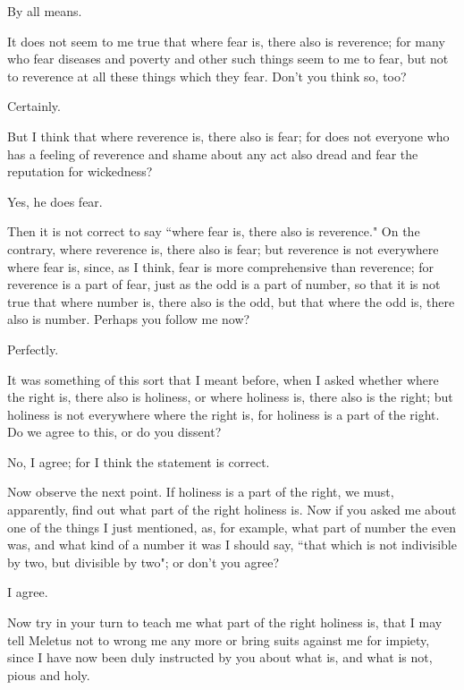 \documentclass[letterpaper,12pt]{article}
\newcommand{\stephpag}[1]{\marginnote{\small\itshape\fontfamily{ppl}\selectfont #1}}
\begin{document}
\begin{drama}
\euthyphrospeaks
By all means.

\socratesspeaks
It does not seem to me true that where fear is, there also is reverence; for many who fear diseases and poverty and other such things seem to me to fear, but not to reverence at all these things which they fear. Don't you think so, too?

\euthyphrospeaks
Certainly.

\socratesspeaks
But I think that where reverence is, there also is fear; for does not everyone who has a feeling of reverence and shame about any act \stephpag{c} also dread and fear the reputation for wickedness?

\euthyphrospeaks
Yes, he does fear.

\socratesspeaks
Then it is not correct to say ``where fear is, there also is reverence." On the contrary, where reverence is, there also is fear; but reverence is not everywhere where fear is, since, as I think, fear is more comprehensive than reverence; for reverence is a part of fear, just as the odd is a part of number, so that it is not true that where number is, there also is the odd, but that where the odd is, there also is number. Perhaps you follow me now?

\euthyphrospeaks
Perfectly.

\socratesspeaks
It was something of this sort that I meant before, when I asked whether where the right is, there also is holiness, or where holiness is, \stephpag{d} there also is the right; but holiness is not everywhere where the right is, for holiness is a part of the right. Do we agree to this, or do you dissent?

\euthyphrospeaks
No, I agree; for I think the statement is correct.

\socratesspeaks
Now observe the next point. If holiness is a part of the right, we must, apparently, find out what part of the right holiness is. Now if you asked me about one of the things I just mentioned, as, for example, what part of number the even was, and what kind of a number it was I should say, ``that which is not indivisible by two, but divisible by two"; or don't you agree?

\euthyphrospeaks
I agree. \stephpag{e} 

\socratesspeaks Now try in your turn to teach me what part of the right holiness is, that I may tell Meletus not to wrong me any more or bring suits against me for impiety, since I have now been duly instructed by you about what is, and what is not, pious and holy.


\end{drama}
\end{document}
